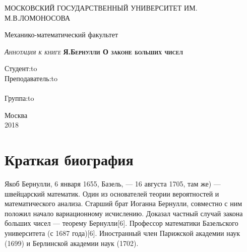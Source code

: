 \documentclass[12pt]{article}
\begin{document}
\renewcommand{\contentsname}{Содержание}

\begin{titlepage} \newpage 
	\begin{center} МОСКОВСКИЙ ГОСУДАРСТВЕННЫЙ УНИВЕРСИТЕТ ИМ. М.В.ЛОМОНОСОВА\\ \end{center} 
	\vspace{3em} 
	\begin{center} \Large Механико-математический факультет \\ \end{center}
	\vspace{5em} 
	\begin{center} 
		\textsc{
			\textit{Аннотация к книге} \linebreak
			\textbf{
				Я.Бернулли \linebreak
				\large{О законе больших чисел}
			}
		}
	\end{center}
	\vspace{6em} \newbox{\lbox}  
	\newlength{\maxl} \setlength{\maxl}{\wd\lbox} \hfill\parbox{11cm}
	{ \hspace*{5cm}\hspace*{-5cm}Студент:\hfill\hbox to\\
	\hspace*{5cm}\hspace*{-5cm}Преподаватель:\hfill\hbox to\\ \\
	\hspace*{5cm}\hspace*{-5cm}Группа:\hfill\hbox to\\ } 
	\vspace{\fill}
	\begin{center} Москва \\ 2018 \end{center} 
\end{titlepage}

\tableofcontents

\newpage
\section{Краткая биография}
Якоб Бернулли, 6 января 1655, Базель, — 16 августа 1705, там же) — швейцарский математик. Один из основателей теории вероятностей и математического анализа. Старший брат Иоганна Бернулли, совместно с ним положил начало вариационному исчислению. Доказал частный случай закона больших чисел — теорему Бернулли[6]. Профессор математики Базельского университета (с 1687 года)[6]. Иностранный член Парижской академии наук (1699) и Берлинской академии наук (1702).
\end{document}
